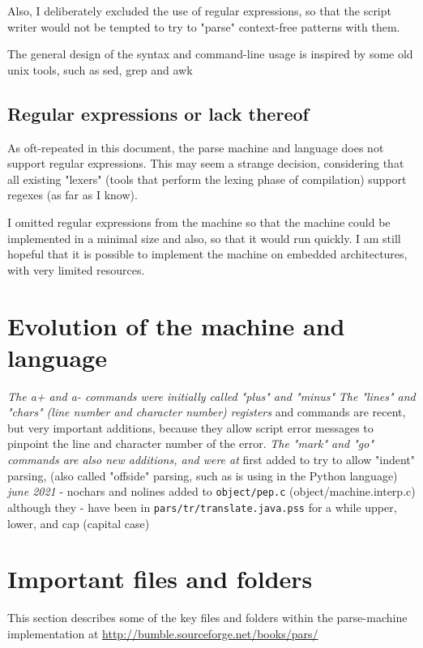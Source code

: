 \documentclass[a4paper,12pt]{article}
\begin{document}
  Also, I deliberately excluded the use of regular expressions, so
  that the script writer would not be tempted to try to "parse"
  context-free patterns with them.

  The general design of the syntax and command-line usage is inspired
  by some old unix tools, such as sed, grep and awk

\subsection{Regular expressions or lack thereof}

  As oft-repeated in this document, the parse machine and language
  does not support regular expressions. This may seem a strange
  decision, considering that all existing "lexers" (tools that
  perform the lexing phase of compilation) support regexes (as
  far as I know).

  I omitted regular expressions from the machine so that the machine
  could be implemented in a minimal size and also, so that it
  would run quickly. I am still hopeful that it is possible to
  implement the machine on embedded architectures, with very
  limited resources.

\section{Evolution of the machine and language}
 \emph{ The a+ and a- commands were initially called "plus" and "minus" }
 \emph{ The "lines" and "chars" (line number and character number) registers }
    and commands are recent, but very important additions, because they
    allow script error messages to pinpoint the line and character number
    of the error.
 \emph{ The "mark" and "go" commands are also new additions, and were at  }
    first added to try to allow "indent" parsing, (also called "offside"
    parsing, such as is using in the Python language)
 \emph{ june 2021 }
    - nochars and nolines added to \texttt{object/pep.c} (object/machine.interp.c) although they
    - have been in \texttt{pars/tr/translate.java.pss} for a while
      upper, lower, and cap (capital case)

\section{Important files and folders}

  This section describes some of the key files and folders within
  the parse-machine implementation at
  \url{http://bumble.sourceforge.net/books/pars/}
\end{document}
